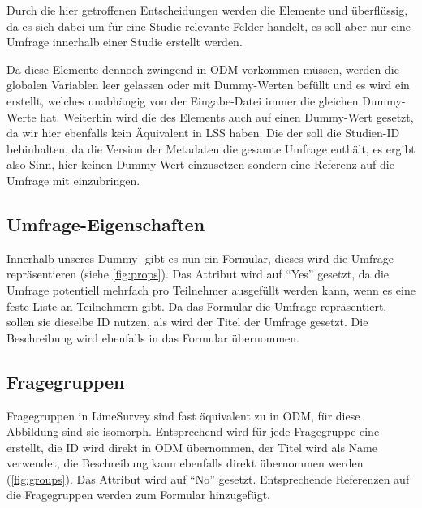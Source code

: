 Durch die hier getroffenen Entscheidungen werden die Elemente  und  überflüssig,	da es sich dabei um für eine Studie relevante Felder handelt, es soll aber nur eine Umfrage innerhalb einer Studie erstellt werden.

Da diese Elemente dennoch zwingend in ODM vorkommen müssen, werden die globalen Variablen leer gelassen oder mit Dummy-Werten befüllt und es wird ein  erstellt, welches unabhängig von der Eingabe-Datei immer die gleichen Dummy-Werte hat.
Weiterhin wird die  des  Elements auch auf einen Dummy-Wert gesetzt, da wir hier ebenfalls kein Äquivalent in LSS haben.
Die  der  soll die Studien-ID behinhalten, da die Version der Metadaten die gesamte Umfrage enthält, es ergibt also Sinn, hier keinen Dummy-Wert einzusetzen sondern eine Referenz auf die Umfrage mit einzubringen.

\subsection{Umfrage-Eigenschaften}
\label{m:survey_meta}

Innerhalb unseres Dummy- gibt es nun ein Formular, dieses wird die Umfrage repräsentieren (siehe \cref{fig:props}).
Das  Attribut wird auf \enquote{Yes} gesetzt, da die Umfrage potentiell mehrfach pro Teilnehmer ausgefüllt werden kann, wenn es eine feste Liste an Teilnehmern gibt.
Da das Formular die Umfrage repräsentiert, sollen sie dieselbe ID nutzen, als  wird der Titel der Umfrage gesetzt. Die Beschreibung wird ebenfalls in das Formular übernommen.

\subsection{Fragegruppen}
\label{m:qg}
Fragegruppen in LimeSurvey sind fast äquivalent zu  in ODM, für diese Abbildung sind sie isomorph.
Entsprechend wird für jede Fragegruppe eine  erstellt, die ID wird direkt in ODM übernommen, der Titel wird als Name verwendet, die Beschreibung kann ebenfalls direkt übernommen werden (\cref{fig:groups}).
Das Attribut  wird auf \enquote{No} gesetzt. %
Entsprechende Referenzen auf die Fragegruppen werden zum Formular hinzugefügt.

